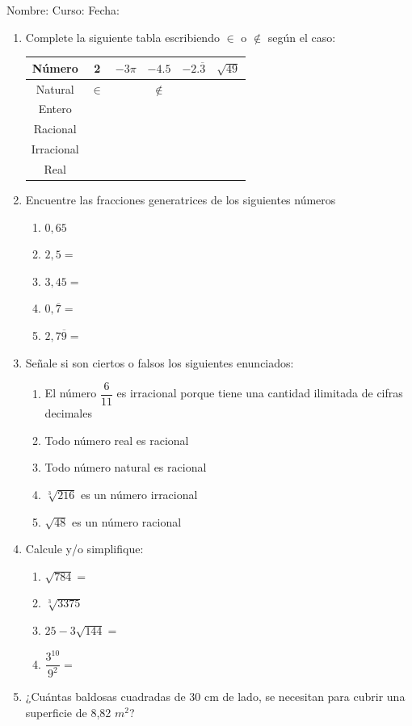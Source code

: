 \documentclass[fleqn]{article}
\newcommand{\LineaNombre}{%
\par
\vspace{\baselineskip}
Nombre:\hrulefill \; Curso: \underline{\hspace*{36pt}} \; Fecha: \underline{\hspace*{2.5cm}} \relax
\par}
\begin{document}
\LineaNombre
\begin{enumerate}
   \item Complete la siguiente tabla escribiendo $\in$ o $\not\in$ según el caso:
\begin{center}
   \begin{tabular}{|c|c|c|c|c|c|}
\hline 
Número & 2 & $-3\pi$ & $-4.5$ & $-2.\overline{3}$ & $\sqrt{49}$ \\ 
\hline 
Natural & $\in$ &  & $\not\in$ &  &  \\ 
\hline 
Entero &  &  &  &  &  \\ 
\hline 
Racional &  &  &  &  &  \\ 
\hline 
Irracional &  &  &  &  &  \\ 
\hline 
Real &  &  &  &  &  \\ 
\hline 
\end{tabular} 
\end{center}
 \item Encuentre las fracciones generatrices de los siguientes números
\begin{enumerate}
\item $0,65$\noanswer
\item $2,5=$\noanswer
\item $3,45=$\noanswer
\item $0,\overline{7}=$\noanswer
\item $2,7\overline{9}=$\noanswer
\end{enumerate}
\item Señale si son ciertos o falsos los siguientes enunciados:
\begin{enumerate}
\item El número $\dfrac{6}{11}$ es irracional porque tiene una cantidad ilimitada de cifras decimales \underline{\hspace*{20pt}}
\item Todo número real es racional \underline{\hspace*{20pt}}
\newpage
\item Todo número natural es racional \underline{\hspace*{20pt}}
\item $\sqrt[3]{216}$ es un número irracional \underline{\hspace*{20pt}}
\item $\sqrt{48}$ es un número racional \underline{\hspace*{20pt}}
\end{enumerate}
\item Calcule y/o simplifique:
\begin{enumerate}
\item $\sqrt{784}=$ \noanswer
\item $\sqrt[3]{3375}$\noanswer
\item $25-3\sqrt{144}=$\noanswer
\item $\dfrac{3^{10}}{9^{2}}=$\noanswer
\end{enumerate}
\item ¿Cuántas baldosas cuadradas de 30 cm de lado, se necesitan para cubrir una superficie de 8,82 $m^{2}$?\noanswer[2in]
\end{enumerate}
\end{document}
